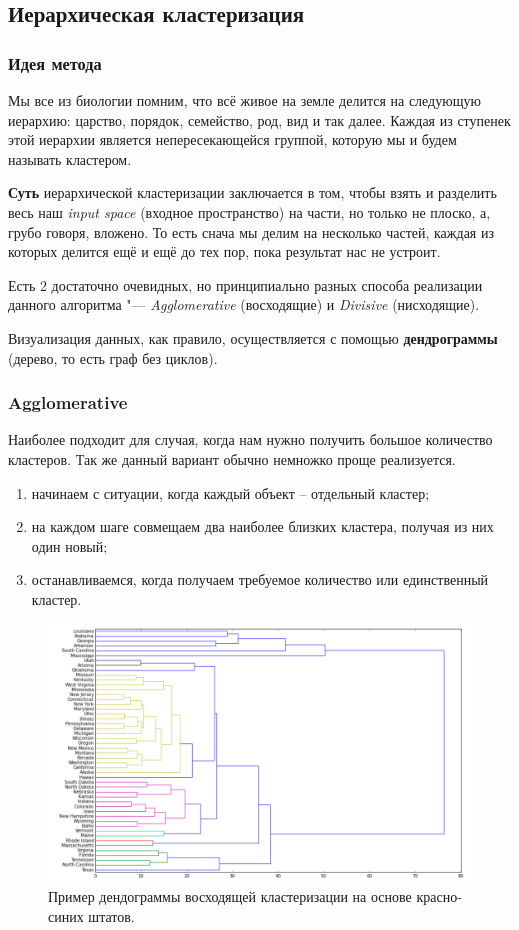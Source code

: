\subsection{Иерархическая кластеризация}
\subsubsection{Идея метода}

Мы все из биологии помним, что всё живое на земле делится на следующую иерархию: царство, порядок, семейство, род, вид и так далее. Каждая из ступенек этой иерархии является непересекающейся группой, которую мы и будем называть кластером.

{\bf Суть} иерархической кластеризации заключается в том, чтобы взять и разделить весь наш {\it input space} (входное пространство) на части, но только не плоско, а, грубо говоря, вложено. То есть снача мы делим на несколько частей, каждая из которых делится ещё и ещё до тех пор, пока результат нас не устроит. 

Есть 2 достаточно очевидных, но принципиально разных способа реализации данного алгоритма "--- {\it Agglomerative} (восходящие) и {\it Divisive} (нисходящие).

Визуализация данных, как правило, осуществляется с помощью {\bf дендрограммы} (дерево, то есть граф без циклов).

\subsubsection{Agglomerative}
Наиболее подходит для случая, когда нам нужно получить большое количество кластеров.
Так же данный вариант обычно немножко проще реализуется.
\begin{enumerate}
\item начинаем с ситуации, когда каждый объект – отдельный кластер;
\item на каждом шаге совмещаем два наиболее близких кластера, получая из них один новый;
\item останавливаемся, когда получаем требуемое количество или единственный кластер.
\end{enumerate}

\begin{figure}[H]
\centering
    \includegraphics[width=150mm]{images/agl.png}
    \caption{Пример дендограммы восходящей кластеризации на основе красно-синих штатов.}
    \label{alg}
\end{figure}

